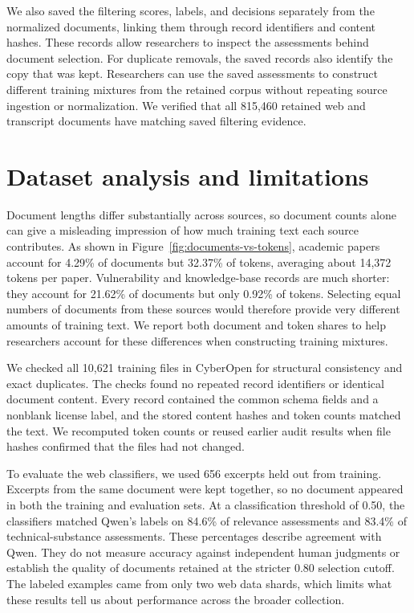 \documentclass[10pt,twocolumn]{article}
\begin{document}
We also saved the filtering scores, labels, and decisions separately from
the normalized documents, linking them through record identifiers and
content hashes. These records allow researchers to inspect the assessments
behind document selection. For duplicate removals, the saved records also
identify the copy that was kept. Researchers can use the saved assessments
to construct different training mixtures from the retained corpus without
repeating source ingestion or normalization. We verified that all 815,460
retained web and transcript documents have matching saved filtering
evidence.

\section{Dataset analysis and limitations}

Document lengths differ substantially across sources, so document counts
alone can give a misleading impression of how much training text each
source contributes. As shown in Figure~\ref{fig:documents-vs-tokens}, academic
papers account for 4.29\% of documents but 32.37\% of tokens, averaging about
14,372 tokens per paper. Vulnerability and knowledge-base records are much
shorter: they account for 21.62\% of documents but only 0.92\% of tokens.
Selecting equal numbers of documents from these sources would therefore
provide very different amounts of training text. We report both document
and token shares to help researchers account for these differences when
constructing training mixtures.

We checked all 10,621 training files in CyberOpen for structural consistency
and exact duplicates. The checks found no repeated record identifiers or identical
document content. Every record contained the common schema fields and a
nonblank license label, and the stored content hashes and token counts
matched the text. We recomputed token counts or reused earlier audit
results when file hashes confirmed that the files had not changed.

To evaluate the web classifiers, we used 656 excerpts held out from
training. Excerpts from the same document were kept together, so no document
appeared in both the training and evaluation sets. At a classification
threshold of 0.50, the classifiers matched Qwen's labels on 84.6\% of
relevance assessments and 83.4\% of technical-substance assessments. These
percentages describe agreement with Qwen. They do not measure accuracy
against independent human judgments or establish the quality of documents
retained at the stricter 0.80 selection cutoff. The labeled examples came
from only two web data shards, which limits what these results tell us
about performance across the broader collection.
\end{document}

